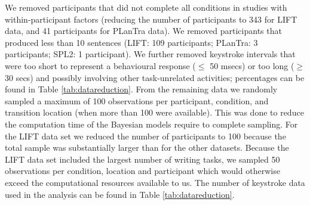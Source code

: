 \documentclass[
  man,floatsintext]{apa7}
\begin{document}
We removed participants that did not complete all conditions in studies with within-participant factors (reducing the number of participants to 343 for LIFT data, and 41 participants for PLanTra data). We removed participants that produced less than 10 sentences (LIFT: 109 participants; PLanTra: 3 participants; SPL2: 1 participant). We further removed keystroke intervals that were too short to represent a behavioural response (\(\le\) 50 msecs) or too long (\(\ge\) 30 secs) and possibly involving other task-unrelated activities; percentages can be found in Table \ref{tab:datareduction}. From the remaining data we randomly sampled a maximum of 100 observations per participant, condition, and transition location (when more than 100 were available). This was done to reduce the computation time of the Bayesian models require to complete sampling. For the LIFT data set we reduced the number of participants to 100 because the total sample was substantially larger than for the other datasets. Because the LIFT data set included the largest number of writing tasks, we sampled 50 observations per condition, location and participant which would otherwise exceed the computational resources available to us. The number of keystroke data used in the analysis can be found in Table \ref{tab:datareduction}.
\end{document}
